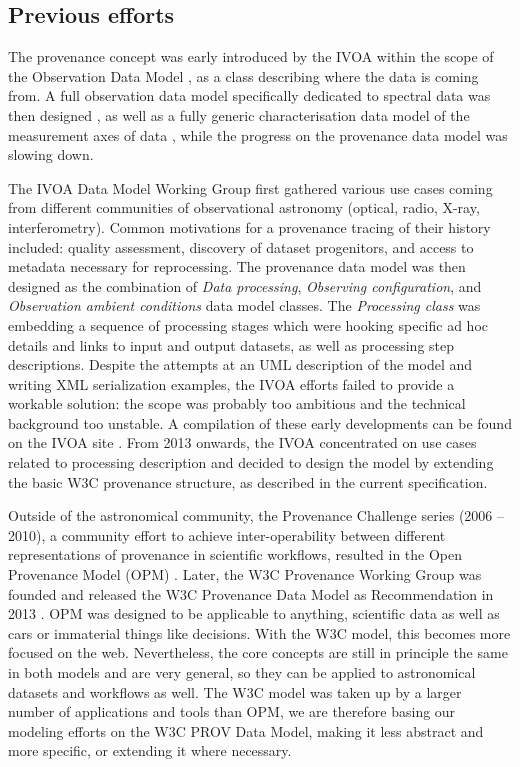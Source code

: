 \subsection{Previous efforts}
The provenance concept was early introduced by the IVOA within the scope of the
Observation Data Model \citep[see IVOA note by ][]{note:observationdm}, as a
class describing where the data is coming from. A full observation data model
specifically dedicated to spectral data was then designed \citep[Spectral Data
Model,][]{std:SpectralDM}, as well as a fully generic characterisation
data model of the measurement axes of data \citep[Characterisation Data
Model,][]{std:CharacterisationDM}, while the progress on the provenance data
model was slowing down.

The IVOA Data Model Working Group first gathered various use cases coming from
different communities of observational astronomy (optical, radio, X-ray,
interferometry). Common motivations for a provenance tracing of their history
included: quality assessment, discovery of dataset progenitors, and access to
metadata necessary for reprocessing. The provenance data model was then designed
as the combination of \emph{Data processing}, \emph{Observing configuration},
and \emph{Observation ambient conditions} data model classes.
The \emph{Processing class} was embedding a sequence of processing stages which
were hooking specific ad hoc details and links to input and output datasets,
as well as processing step descriptions. Despite the attempts at
an UML description of the model and writing XML serialization examples, the IVOA
efforts failed to provide a workable solution: the scope was probably too
ambitious and the technical background too unstable. A compilation of these
early developments can be found on the IVOA site \citep{std:previousefforts}.
From 2013 onwards, the IVOA concentrated on use cases related to processing
description and decided to design the model by extending the basic W3C
provenance structure, as described in the current specification. 

Outside of the astronomical community, the Provenance Challenge series (2006 --
2010), a community effort to achieve inter-operability between different
representations of provenance in scientific workflows, resulted in the Open
Provenance Model (OPM) \citep{moreau2010}. Later, the W3C Provenance Working
Group was founded and released the W3C Provenance Data Model as Recommendation
in 2013 \citep{std:W3CProvDM}. OPM was designed to be applicable to anything,
scientific data as well as cars or immaterial things like decisions. With the
W3C model, this becomes more focused on the web. Nevertheless, the core concepts
are still in principle the same in both models and are very general, so they
can be applied to astronomical datasets and workflows as well. The W3C model was
taken up by a larger number of applications and tools than OPM, we are therefore
basing our modeling efforts on the W3C PROV Data Model, making it less
abstract and more specific, or extending it where necessary. 


